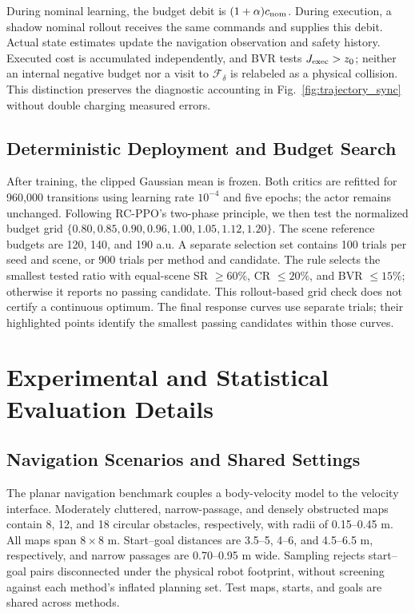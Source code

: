 \documentclass[conference]{IEEEtran}
\begin{document}
During nominal learning, the budget debit is $(1+\alpha)c_{\rm nom}$.
During execution, a shadow nominal rollout receives the same commands and
supplies this debit. Actual state estimates update the navigation observation
and safety history. Executed cost is accumulated independently, and BVR tests
$J_{\rm exec}>z_0$; neither an internal negative budget nor a visit to
$\mathcal F_\delta$ is relabeled as a physical collision.
This distinction preserves the diagnostic accounting in
Fig.~\ref{fig:trajectory_sync} without double charging measured errors.

\subsection{Deterministic Deployment and Budget Search}
\label{app:deployment_search}
After training, the clipped Gaussian mean is frozen. Both critics are refitted
for 960,000 transitions using learning rate $10^{-4}$ and five epochs;
the actor remains unchanged. Following RC-PPO's two-phase principle, we then
test the normalized budget grid
$\{0.80,\allowbreak0.85,\allowbreak0.90,\allowbreak0.96,\allowbreak
1.00,\allowbreak1.05,\allowbreak1.12,\allowbreak1.20\}$.
The scene reference budgets are 120, 140, and 190 a.u.
A separate selection set contains 100 trials per seed and scene, or
900 trials per method and candidate. The rule selects the smallest tested
ratio with equal-scene SR $\geq60\%$, CR $\leq20\%$, and BVR $\leq15\%$;
otherwise it reports no passing candidate. This rollout-based grid check
does not certify a continuous optimum.
The final response curves use separate trials; their highlighted points
identify the smallest passing candidates within those curves.

\section{Experimental and Statistical Evaluation Details}
\label{app:statistical_evaluation}
\subsection{Navigation Scenarios and Shared Settings}
The planar navigation benchmark couples a body-velocity model to the velocity
interface. Moderately cluttered, narrow-passage, and densely obstructed maps
contain 8, 12, and 18 circular obstacles, respectively, with radii of
0.15--0.45 m. All maps span $8\times8$ m. Start--goal distances are
3.5--5, 4--6, and 4.5--6.5 m, respectively, and narrow passages are
0.70--0.95 m wide. Sampling rejects start--goal pairs disconnected under the
physical robot footprint, without screening against each method's inflated
planning set. Test maps, starts, and goals are shared across methods.
\end{document}
